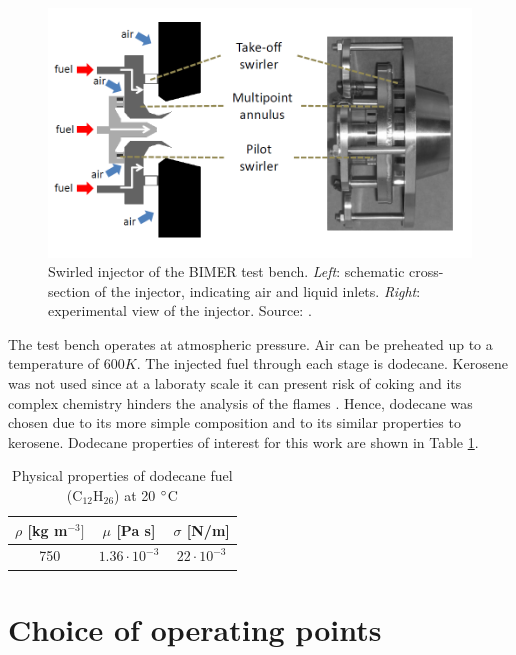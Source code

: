 \begin{figure}[h!]
	\centering
	\includegraphics[scale=0.7]{./part3_applications/figures_ch7_aero/BIMER_swirler}
	\caption{Swirled injector of the BIMER test bench. \textsl{Left}: schematic cross-section of the injector, indicating air and liquid inlets. \textsl{Right}: experimental view of the injector. Source: .}
	\label{fig:BIMER_swirler}
\end{figure}

The test bench operates at atmospheric pressure. Air can be preheated up to a temperature of $600 K$. The injected fuel through each stage is dodecane. Kerosene was not used since at a laboraty scale it can present risk of coking and its complex chemistry hinders the analysis of the flames . Hence, dodecane was chosen due to its more simple composition and to its similar properties to kerosene. Dodecane properties of interest for this work are shown in Table \ref{tab:dodecane_properties}.

\begin{table}[!h]
\centering
\caption{Physical properties of dodecane fuel (C$_{12}$H$_26$) at 20 $\degree$C}
\begin{tabular}{|c|c|c|}
\hline
$\rho$ [kg m$^{-3}]$   & $\mu$ [Pa s]   & $\sigma$ [N/m]  \\
\hline
750 & $1.36 \cdot 10^{-3}$ & $22 \cdot 10^{-3}$ \\
\hline
\end{tabular}
\label{tab:dodecane_properties}
\end{table}


\section{Choice of operating points}



